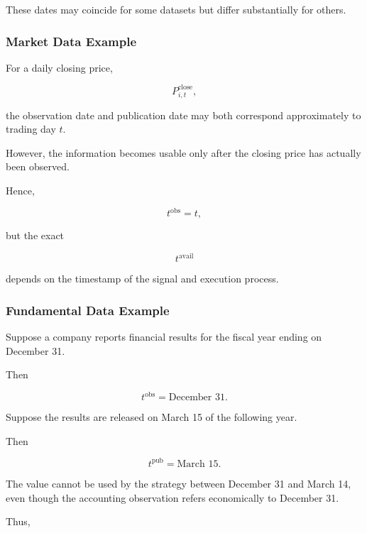 \documentclass[11pt,a4paper]{article}
\begin{document}
These dates may coincide for some datasets but differ substantially for others.


\subsubsection{Market Data Example}

For a daily closing price,

\begin{equation}
P_{i,t}^{\mathrm{close}},
\end{equation}

the observation date and publication date may both correspond approximately to
trading day $t$.

However, the information becomes usable only after the closing price has
actually been observed.

Hence,

\begin{equation}
t^{\mathrm{obs}}
=
t,
\end{equation}

but the exact

\begin{equation}
t^{\mathrm{avail}}
\end{equation}

depends on the timestamp of the signal and execution process.


\subsubsection{Fundamental Data Example}

Suppose a company reports financial results for the fiscal year ending on
December 31.

Then

\begin{equation}
t^{\mathrm{obs}}
=
\text{December 31}.
\end{equation}

Suppose the results are released on March 15 of the following year.

Then

\begin{equation}
t^{\mathrm{pub}}
=
\text{March 15}.
\end{equation}

The value cannot be used by the strategy between December 31 and March 14,
even though the accounting observation refers economically to December 31.

Thus,
\end{document}
